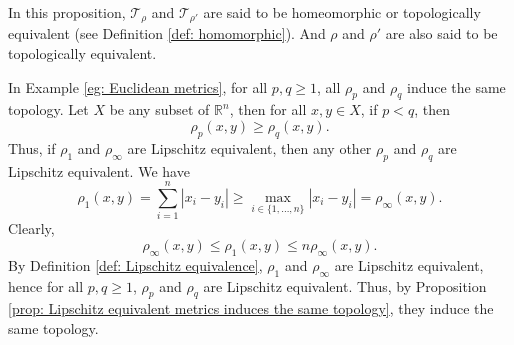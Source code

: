 \begin{note}
	In this proposition, $\mathcal T_\rho$ and $\mathcal T_{\rho'}$ are said to be homeomorphic or topologically equivalent (see Definition \ref{def: homomorphic}). And $\rho$ and $\rho'$ are also said to be topologically equivalent.
\end{note}


\begin{example}
	In Example \ref{eg: Euclidean metrics}, for all $p,q \ge 1$, all $\rho_p$ and $\rho_q$ induce the same topology. Let $X$ be any subset of $\mathbb R^n$, then for all $x,y \in X$, if $p < q$, then
	$$
	\rho_p (x,y) \ge \rho_q (x,y).
	$$
	Thus, if $\rho_1$ and $\rho_\infty$ are Lipschitz equivalent, then any other $\rho_p$ and $\rho_q$ are Lipschitz equivalent. We have
	$$
	\rho_1 (x,y) = \sum_{i = 1}^n |x_i - y_i| \ge \max_{i \in \{1, \ldots, n\}} |x_i - y_i| = \rho_\infty (x,y).
 	$$
 	Clearly,
 	$$
 	\rho_\infty (x,y) \le \rho_1 (x,y) \le n \rho_\infty (x,y).
 	$$
 	By Definition \ref{def: Lipschitz equivalence}, $\rho_1$ and $\rho_\infty$ are Lipschitz equivalent, hence for all $p, q \ge 1$, $\rho_p$ and $\rho_q$ are Lipschitz equivalent. Thus, by Proposition \ref{prop: Lipschitz equivalent metrics induces the same topology}, they induce the same topology.
\end{example}






























